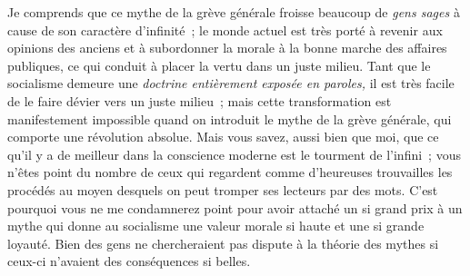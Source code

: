 \documentclass[french,twoside]{book} %
\begin{document}
Je comprends que ce mythe de la grève générale froisse beaucoup de \emph{gens sages} à cause de son caractère d’infinité ; le monde actuel est très porté à revenir aux opinions des anciens et à subordonner la morale à la bonne marche des affaires publiques, ce qui conduit à placer la vertu dans un juste milieu. Tant que le socialisme demeure une \emph{doctrine entièrement exposée en paroles,} il est très facile de le faire dévier vers un juste milieu ; mais cette transformation est manifestement impossible quand on introduit le mythe de la grève générale, qui comporte une révolution absolue. Mais vous savez, aussi bien que moi, que ce qu’il y a de meilleur dans la conscience moderne est le tourment de l’infini ; vous n’êtes point du nombre de ceux qui regardent comme d’heureuses trouvailles les procédés au moyen desquels on peut tromper ses lecteurs par des mots. C’est pourquoi vous ne me condamnerez point pour avoir attaché un si grand prix à un mythe qui donne au socialisme une valeur morale si haute et une si grande loyauté. Bien des gens ne chercheraient pas dispute à la théorie des mythes si ceux-ci n’avaient des conséquences si belles.
\end{document}
